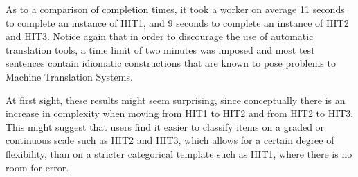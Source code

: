 \documentclass[11pt]{elsarticle}
\begin{document}
As to a comparison of completion times, it took a worker on average 11 seconds to complete an instance of HIT1, and 9 seconds to complete an instance of HIT2 and HIT3. Notice again that in order to discourage the use of automatic translation tools, a time limit of two minutes was imposed and most test sentences contain idiomatic constructions that are known to pose problems to Machine Translation Systems.

At first sight, these results might seem surprising, since conceptually there is an increase in complexity when moving from HIT1 to HIT2 and from HIT2 to HIT3. This might suggest that users find it easier to classify items on a graded or continuous scale such as HIT2 and HIT3, which allows for a certain degree of flexibility, than on a stricter categorical template such as HIT1, where there is no room for error.
\end{document}
